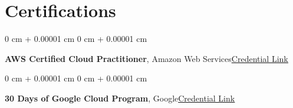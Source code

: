 \documentclass[10pt, a4paper]{article}
\newenvironment{onecolentry}{
    \begin{adjustwidth}{
        0 cm + 0.00001 cm
    }{
        0 cm + 0.00001 cm
    }
}{
    \end{adjustwidth}
} %
\begin{document}
    \section{Certifications}

    \begin{onecolentry}
        \textbf{AWS Certified Cloud Practitioner}, Amazon Web Services\hfill \href{https://cp.certmetrics.com/amazon/en/public/verify/credential/21NY0Y6C714E1JSB}{\underline{Credential Link}}
    \end{onecolentry}
    
    \begin{onecolentry}
        \textbf{30 Days of Google Cloud Program}, Google\hfill \href{https://drive.google.com/file/d/131IwLvWr8a6YWLYd5ILZ6kvacsKfmkWc/view}{\underline{Credential Link}}
    \end{onecolentry}
    
\end{document}
